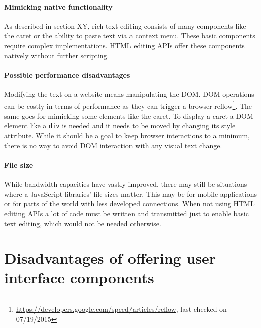

\paragraph{Mimicking native functionality} As described in section XY, rich-text editing consists of many components like the caret or the ability to paste text via a context menu. These basic components require complex implementations. HTML editing APIs offer these components natively without further scripting.

\paragraph{Possible performance disadvantages} Modifying the text on a website means manipulating the DOM. DOM operations can be costly in terms of performance as they can trigger a browser reflow\footnote{\url{https://developers.google.com/speed/articles/reflow}, last checked on 07/19/2015}. The same goes for mimicking some elements like the caret. To display a caret a DOM element like a \texttt{div} is needed and it needs to be moved by changing its style attribute. While it should be a goal to keep browser interactions to a minimum, there is no way to avoid DOM interaction with any visual text change.

\paragraph{File size} While bandwidth capacities have vastly improved, there may still be situations where a JavaScript libraries' file sizes matter. This may be for mobile applications or for parts of the world with less developed connections. When not using HTML editing APIs a lot of code must be written and transmitted just to enable basic text editing, which would not be needed otherwise.

\section{Disadvantages of offering user interface components}

